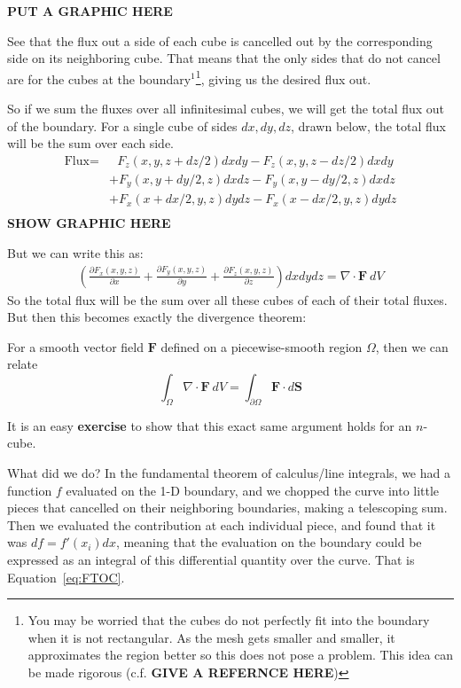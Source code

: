 	\textbf{PUT A GRAPHIC HERE}
	
	See that the flux out a side of each cube is cancelled out by the corresponding side on its neighboring cube. That means that the only sides that do not cancel are for the cubes at the boundary$^1$\footnote{You may be worried that the cubes do not perfectly fit into the boundary when it is not rectangular. As the mesh gets smaller and smaller, it approximates the region better so this does not pose a problem. This idea can be made rigorous (c.f. \textbf{GIVE A REFERNCE HERE})}, giving us the desired flux out.
	
	So if we sum the fluxes over all infinitesimal cubes, we will get the total flux out of the boundary. For a single cube of sides $dx,dy,dz$, drawn below, the total flux will be the sum over each side. 
	\begin{align*}
		\text{Flux} =&~~~  F_z(x,y,z+dz/2) dx dy -  F_z(x,y,z-dz/2) dx dy \\ 
						   & + F_y (x,y+dy/2,z) dx dz - F_y (x,y-dy/2,z) dx dz \\ 
						   & + F_x (x+dx/2,y,z) dy dz - F_x (x-dx/2,y,z) dy dz \\ 
	\end{align*}
	\textbf{SHOW GRAPHIC HERE}
	
	But we can write this as: 
	\begin{align*}
		\left( \frac{\partial F_x (x,y,z)}{\partial x} + \frac{\partial F_y (x,y,z)}{\partial y} + \frac{\partial F_z(x,y,z)}{\partial z} \right) dx dy dz = \nabla \cdot \mathbf F ~ dV
	\end{align*}
	So the total flux will be the sum over all these cubes of each of their total fluxes. But then this becomes exactly the divergence theorem:
	\begin{theorem}
	For a smooth vector field $\mathbf F$ defined on a piecewise-smooth region $\Omega$, then we can relate
		\begin{equation*}
			\int_\Omega \nabla \cdot \mathbf F ~ dV = \int_{\partial \Omega} \mathbf{F} \cdot d \mathbf S
		\end{equation*}
	\end{theorem}
	
	It is an easy \textbf{exercise} to show that this exact same argument holds for an $n$-cube. 
	
	What did we do? In the fundamental theorem of calculus/line integrals, we had a function $f$ evaluated on the 1-D boundary, and we chopped the curve into little pieces that cancelled on their neighboring boundaries, making a telescoping sum. Then we evaluated the contribution at each individual piece, and found that it was $df = f'(x_i) dx$, meaning that the evaluation on the boundary could be expressed as an integral of this differential quantity over the curve. That is Equation~\eqref{eq:FTOC}.
	
